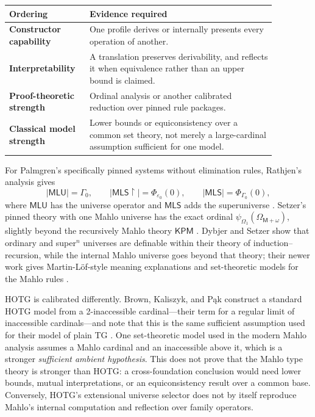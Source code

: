\documentclass[11pt]{article}
\theoremstyle{definition}
\theoremstyle{remark}
\begin{document}
\begin{center}
\begin{tabular}{>{\raggedright\arraybackslash\bfseries}p{0.23\linewidth}
                >{\raggedright\arraybackslash}p{0.64\linewidth}}
\toprule
Ordering & Evidence required \\
\midrule
Constructor capability & One profile derives or internally presents every
  operation of another. \\
Interpretability & A translation preserves derivability, and reflects it when
  equivalence rather than an upper bound is claimed. \\
Proof-theoretic strength & Ordinal analysis or another calibrated reduction over
  pinned rule packages. \\
Classical model strength & Lower bounds or equiconsistency over a common set
  theory, not merely a large-cardinal assumption sufficient for one model. \\
\bottomrule
\end{tabular}
\end{center}

For Palmgren's specifically pinned systems without elimination rules, Rathjen's
analysis gives
\[
 |\mathsf{MLU}|=\Gamma_0,\qquad
 |\mathsf{MLS}{\upharpoonright}|=\Phi_{\varepsilon_0}(0),\qquad
 |\mathsf{MLS}|=\Phi_{\Gamma_0}(0),
\]
where $\mathsf{MLU}$ has the universe operator and $\mathsf{MLS}$ adds the
superuniverse \cite{PalmgrenUniverses}.  Setzer's pinned theory with one Mahlo
universe has the exact ordinal
$\psi_{\Omega_1}(\Omega_{\mathsf M+\omega})$, slightly beyond the recursively
Mahlo theory $\mathsf{KPM}$ \cite{SetzerMahlo,SetzerProofTheory}.  Dybjer and
Setzer show that ordinary and super$^n$ universes are definable within their
theory of induction--recursion, while the internal Mahlo universe goes beyond
that theory; their newer work gives Martin-L\"of-style meaning explanations and
set-theoretic models for the Mahlo rules
\cite{DybjerSetzerMahlo,DybjerSetzerPredicativity}.

HOTG is calibrated differently.  Brown, Kaliszyk, and P\k{a}k construct a
standard HOTG model from a 2-inaccessible cardinal---their term for a regular
limit of inaccessible cardinals---and note that this is the same sufficient
assumption used for their model of plain TG
\cite{BrownKaliszykPakHOTG}.  One set-theoretic model used in the modern Mahlo
analysis assumes a Mahlo cardinal and an inaccessible above it, which is a
stronger \emph{sufficient ambient hypothesis}.  This does not prove that the
Mahlo type theory is stronger than HOTG: a cross-foundation conclusion would
need lower bounds, mutual interpretations, or an equiconsistency result over a
common base.  Conversely, HOTG's extensional universe selector does not by
itself reproduce Mahlo's internal computation and reflection over family
operators.
\end{document}
